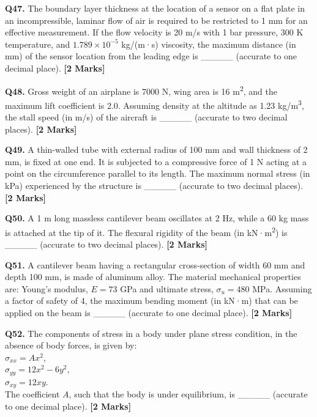 \documentclass[11pt]{article}
\newcommand{\questionb}[2]{
    \noindent\textbf{Q#2.} #1 \hfill \textbf{[2 Marks]}
}
\begin{document}
\vspace{0.5cm}

\questionb{The boundary layer thickness at the location of a sensor on a flat plate in an incompressible, laminar flow of air is required to be restricted to 1 mm for an effective measurement. If the flow velocity is 20 m/s with 1 bar pressure, 300 K temperature, and $1.789 \times 10^{-5}$ kg/(m·s) viscosity, the maximum distance (in mm) of the sensor location from the leading edge is \_\_\_\_\_ (accurate to one decimal place).}{47}

\vspace{0.5cm}

\questionb{Gross weight of an airplane is 7000 N, wing area is 16 m\textsuperscript{2}, and the maximum lift coefficient is 2.0. Assuming density at the altitude as 1.23 kg/m\textsuperscript{3}, the stall speed (in m/s) of the aircraft is \_\_\_\_\_ (accurate to two decimal places).}{48}


\vspace{0.5cm}

\questionb{A thin-walled tube with external radius of 100 mm and wall thickness of 2 mm, is fixed at one end. It is subjected to a compressive force of 1 N acting at a point on the circumference parallel to its length. The maximum normal stress (in kPa) experienced by the structure is \_\_\_\_\_ (accurate to two decimal places).}{49}

\vspace{0.5cm}

\questionb{A 1 m long massless cantilever beam oscillates at 2 Hz, while a 60 kg mass is attached at the tip of it. The flexural rigidity of the beam (in kN·m\textsuperscript{2}) is \_\_\_\_\_ (accurate to two decimal places).}{50}

\vspace{0.5cm}

\questionb{A cantilever beam having a rectangular cross-section of width 60 mm and depth 100 mm, is made of aluminum alloy. The material mechanical properties are: Young’s modulus, $E = 73$ GPa and ultimate stress, $\sigma_u = 480$ MPa. Assuming a factor of safety of 4, the maximum bending moment (in kN·m) that can be applied on the beam is \_\_\_\_\_ (accurate to one decimal place).}{51}

\vspace{0.5cm}

\questionb{The components of stress in a body under plane stress condition, in the absence of body forces, is given by: \\
$\sigma_{xx} = Ax^2$, \\
$\sigma_{yy} = 12x^2 - 6y^2$, \\
$\sigma_{xy} = 12xy$. \\
The coefficient $A$, such that the body is under equilibrium, is \_\_\_\_\_ (accurate to one decimal place).}{52}
\end{document}
